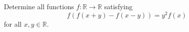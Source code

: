 Determine all functions $f \colon \mathbb{R} \to \mathbb{R}$ satisfying
$$f(f(x+y)-f(x-y))=y^2f(x)$$for all $x, y \in \mathbb{R}$.